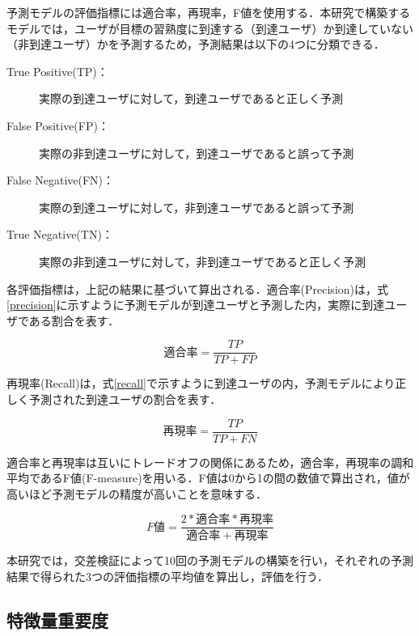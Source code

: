 \documentclass[11pt,dvipdfmx]{jreport}
\begin{document}
予測モデルの評価指標には適合率，再現率，F値を使用する．本研究で構築するモデルでは，ユーザが目標の習熟度に到達する（到達ユーザ）か到達していない（非到達ユーザ）かを予測するため，予測結果は以下の4つに分類できる．

\begin{description}
\item [True Positive(TP)：]実際の到達ユーザに対して，到達ユーザであると正しく予測
\item [False Positive(FP)：]実際の非到達ユーザに対して，到達ユーザであると誤って予測
\item [False Negative(FN)：]実際の到達ユーザに対して，非到達ユーザであると誤って予測
\item [True Negative(TN)：]実際の非到達ユーザに対して，非到達ユーザであると正しく予測
\end{description}

各評価指標は，上記の結果に基づいて算出される．適合率(Precision)は，式\ref{precision}に示すように予測モデルが到達ユーザと予測した内，実際に到達ユーザである割合を表す．

\begin{equation}
  適合率 = \frac{TP}{TP + FP} \label{precision}
\end{equation}
\vspace{.5mm}

再現率(Recall)は，式\ref{recall}で示すように到達ユーザの内，予測モデルにより正しく予測された到達ユーザの割合を表す．

\begin{equation}
  再現率 = \frac{TP}{TP + FN} \label{recall}
\end{equation}
\vspace{.5mm}

適合率と再現率は互いにトレードオフの関係にあるため，適合率，再現率の調和平均であるF値(F-measure)を用いる．F値は0から1の間の数値で算出され，値が高いほど予測モデルの精度が高いことを意味する．

\begin{equation}
  F値 = \frac{2 * 適合率 * 再現率}{適合率 + 再現率} \label{f-measure}
\end{equation}
\vspace{.5mm}

本研究では，交差検証によって10回の予測モデルの構築を行い，それぞれの予測結果で得られた3つの評価指標の平均値を算出し，評価を行う．

\subsection{特徴量重要度}
\end{document}
